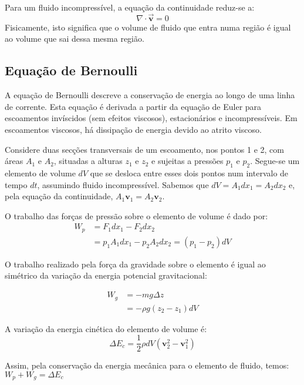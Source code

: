 Para um fluido incompressível, a equação da continuidade reduz-se a:
\begin{equation*}
    \nabla \cdot \vec{\mathbf{v}} = 0
\end{equation*}
Fisicamente, isto significa que o volume de fluido que entra numa região é igual ao volume que sai dessa mesma região.


\subsection{Equação de Bernoulli}

A equação de Bernoulli descreve a conservação de energia ao longo de uma linha de corrente. Esta equação é derivada a partir da equação de Euler para escoamentos invíscidos (sem efeitos viscosos), estacionários e incompressíveis. Em escoamentos viscosos, há dissipação de energia devido ao atrito viscoso.

Considere duas secções transversais de um escoamento, nos pontos 1 e 2, com áreas \(A_1\) e \(A_2\), situadas a alturas \(z_1\) e \(z_2\) e sujeitas a pressões \(p_1\) e \(p_2\). Segue-se um elemento de volume \(dV\) que se desloca entre esses dois pontos num intervalo de tempo \(dt\), assumindo fluido incompressível. Sabemos que \(dV = A_1 dx_1 = A_2 dx_2\) e, pela equação da continuidade, \(A_1 \mathbf{v}_1 = A_2 \mathbf{v}_2\).

O trabalho das forças de pressão sobre o elemento de volume é dado por:
\begin{align*}
    W_p & = F_1 dx_1 - F_2 dx_2 \\
    & = p_1 A_1 dx_1 - p_2 A_2 dx_2 = (p_1 - p_2) dV
\end{align*}

O trabalho realizado pela força da gravidade sobre o elemento é igual ao simétrico da variação da energia potencial gravitacional:

\begin{align*}
    W_g &= - m g \Delta z \\
    &= - \rho g (z_2 - z_1) dV
\end{align*}

A variação da energia cinética do elemento de volume é:
\begin{equation*}
    \Delta E_c = \frac{1}{2} \rho dV (\mathbf{v}_2^2 - \mathbf{v}_1^2)
\end{equation*}

Assim, pela conservação da energia mecânica para o elemento de fluido, temos: $W_p + W_g = \Delta E_c$

